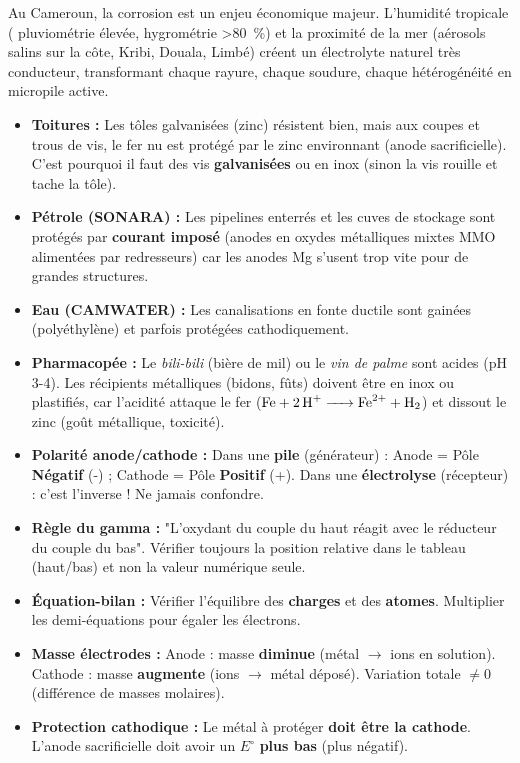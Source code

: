 \documentclass[11pt]{article}
\begin{document}
\begin{savaistu}
Au Cameroun, la corrosion est un enjeu économique majeur. L'humidité tropicale ( pluviométrie élevée, hygrométrie \SI{>80}{\%}) et la proximité de la mer (aérosols salins sur la côte, Kribi, Douala, Limbé) créent un électrolyte naturel très conducteur, transformant chaque rayure, chaque soudure, chaque hétérogénéité en micropile active.
\begin{itemize}
\item \textbf{Toitures :} Les tôles galvanisées (zinc) résistent bien, mais aux coupes et trous de vis, le fer nu est protégé par le zinc environnant (anode sacrificielle). C'est pourquoi il faut des vis \textbf{galvanisées} ou en inox (sinon la vis rouille et tache la tôle).
\item \textbf{Pétrole (SONARA) :} Les pipelines enterrés et les cuves de stockage sont protégés par \textbf{courant imposé} (anodes en oxydes métalliques mixtes MMO alimentées par redresseurs) car les anodes Mg s'usent trop vite pour de grandes structures.
\item \textbf{Eau (CAMWATER) :} Les canalisations en fonte ductile sont gainées (polyéthylène) et parfois protégées cathodiquement.
\item \textbf{Pharmacopée :} Le \emph{bili-bili} (bière de mil) ou le \emph{vin de palme} sont acides (pH 3-4). Les récipients métalliques (bidons, fûts) doivent être en inox ou plastifiés, car l'acidité attaque le fer ($\ce{Fe + 2H+ -> Fe^2+ + H2}$) et dissout le zinc (goût métallique, toxicité).
\end{itemize}
\end{savaistu}

\begin{attention}
\begin{itemize}
\item \textbf{Polarité anode/cathode :} Dans une \textbf{pile} (générateur) : Anode = Pôle \textbf{Négatif} (-) ; Cathode = Pôle \textbf{Positif} (+). Dans une \textbf{électrolyse} (récepteur) : c'est l'inverse ! Ne jamais confondre.
\item \textbf{Règle du gamma :} "L'oxydant du couple du haut réagit avec le réducteur du couple du bas". Vérifier toujours la position relative dans le tableau (haut/bas) et non la valeur numérique seule.
\item \textbf{Équation-bilan :} Vérifier l'équilibre des \textbf{charges} et des \textbf{atomes}. Multiplier les demi-équations pour égaler les électrons.
\item \textbf{Masse électrodes :} Anode : masse \textbf{diminue} (métal $\to$ ions en solution). Cathode : masse \textbf{augmente} (ions $\to$ métal déposé). Variation totale $\neq 0$ (différence de masses molaires).
\item \textbf{Protection cathodique :} Le métal à protéger \textbf{doit être la cathode}. L'anode sacrificielle doit avoir un $E^\circ$ \textbf{plus bas} (plus négatif).
\end{itemize}
\end{attention}
\end{document}
